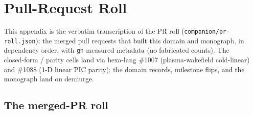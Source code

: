\section{Pull-Request Roll}
\label{app:prroll}

This appendix is the verbatim transcription of the PR roll
(\texttt{companion/\allowbreak pr-roll.json}): the merged pull requests
that built this domain and monograph, in dependency order, with
\texttt{gh}-measured metadata (no fabricated counts). The closed-form /
parity cells land via hexa-lang \#1007 (plasma-wakefield cold-linear) and
\#1088 (1-D linear PIC parity); the domain records, milestone flips, and
the monograph land on demiurge.

\subsection{The merged-PR roll}
\label{app:prroll-table}

